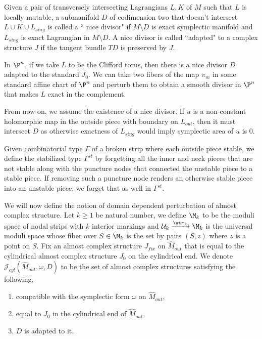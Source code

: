 \begin{defn} \label{def:nicediv}
Given a pair of transversely intersecting Lagrangians $L,K$ of $M$ such that $L$ is locally mutable, a submanifold $D$ of codimension two that doesn't intersect $L \cup K \cup L_{sing}$ is called a `` nice divisor" if $M\setminus D$ is exact symplectic manifold and $L_{sing}$ is exact Lagrangian in $M\setminus D$. A nice divisor is called ``adapted" to a complex structure $J$ if the tangent bundle $TD$ is preserved by $J$.
\end{defn}

\begin{remark}
In $\P^n$, if we take $L$ to be the Clifford torus, then there is a nice divisor $D$ adapted to the standard $J_0$. We can take two fibers of the map $\pi_m$ in some standard affine chart of $\P^n$ and perturb them to obtain a smooth divisor in $\P^n$ that makes $L$ exact in the complement.         
\end{remark}

From now on, we assume the existence of a nice divisor. If $u$ is a non-constant holomorphic map in the outside piece with boundary on $L_{out}$, then it must intersect $D$ as otherwise exactness of $L_{sing}$ would imply symplectic area of $u$ is 0. 

\begin{defn}\label{defn:stabilz}
Given combinatorial type $\Gamma$ of a broken strip where each outside piece stable, we define the stabilized type $\Gamma^{st}$ by forgetting all the inner and neck pieces that are not stable along with the puncture nodes that connected the unstable piece to a stable piece. If removing such a puncture node renders an otherwise stable piece into an unstable piece, we forget that as well in $\Gamma^{st}$. 
\end{defn}


We will now define the notion of domain dependent perturbation of almost complex structure. Let $k\geq 1$ be natural number, we define $\M_k$ to be the moduli space of nodal strips with $k$ interior markings  and $\mathcal{U}_k \xrightarrow{\wt\pi_{k}} \M_{k}$ is the universal moduli space whose fiber over $S\in \M_{k}$ is the set by pairs $(S,z)$ where $z$ is a point on $S$.  Fix an almost complex structure $ J_{fix}$ on $\widehat M_{out}$ that is equal to the cylindrical almost complex structure $J_0$ on the cylindrical end.  We denote $\mathcal{J}_{cyl}(\widehat M_{out},\omega,D)$ to be the set of almost complex structures satisfying the following,
\begin{enumerate}
    \item compatible with the symplectic form $\omega$ on $\widehat M_{out}$,
    \item equal to $J_0$ in the cylindrical end of $\widehat M_{out}$,
    \item $D$ is adapted to it.
\end{enumerate} 

